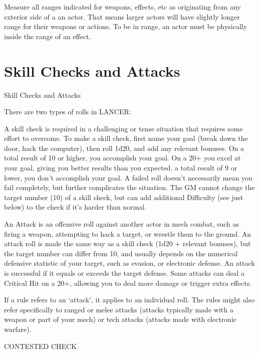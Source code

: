 Measure all ranges indicated for weapons, effects, etc as originating from any exterior side of a  
an actor. That means larger actors will have slightly longer range for their weapons or actions. To  
be in range, an actor must be physically inside the range of an effect.
 
\chapter{Skill Checks and Attacks}
   Skill Checks and Attacks  

There are two types of rolls in LANCER:
 

A skill check is required in a challenging or tense situation that requires some effort to  
overcome. To make a skill check, first name your goal (break down the door, hack the computer),  
then roll 1d20, and add any relevant bonuses. On a total result of 10 or higher, you accomplish  
your goal. On a 20+ you excel at your goal, giving you better results than you expected. a total  
result of 9 or lower, you don’t accomplish your goal. A failed roll doesn’t necessarily mean you  
fail completely, but further complicates the situation. The GM cannot change the target number  
(10) of a skill check, but can add additional Difficulty (see just below) to the check if it’s harder  
than normal.
 

                                                                                                                 


An Attack is an offensive roll against another actor in mech combat, such as firing a weapon,  
attempting to hack a target, or wrestle them to the ground. An attack roll is made the same way  
as a skill check (1d20 + relevant bonuses), but the target number can differ from 10, and usually  
depends on the numerical defensive statistic of your target, such as evasion, or electronic  
defense. An attack is successful if it equals or exceeds the target defense. Some attacks can  
deal a Critical Hit on a 20+, allowing you to deal more damage or trigger extra effects.
 

If a rule refers to an ‘attack’, it applies to an individual roll. The rules might also refer specifically  
to ranged or melee attacks (attacks typically made with a weapon or part of your mech) or tech  
attacks (attacks made with electronic warfare). 
 

                                           CONTESTED CHECK  


